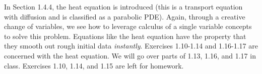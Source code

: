 \documentclass{amsart}
\theoremstyle{plain}
\theoremstyle{definition}
\theoremstyle{remark}
\theoremstyle{definition}
\numberwithin{equation}{section}
\numberwithin{equation}{section}
\begin{document}
In Section 1.4.4, the heat equation is introduced (this is a transport equation with diffusion and is classified as a parabolic PDE). 
Again, through a creative change of variables, we see how to leverage calculus of a single variable concepts to solve this problem. 
Equations like the heat equation have the property that they smooth out rough initial data {\em instantly}. 
Exercises 1.10-1.14 and 1.16-1.17 are concerned with the heat equation.
We will go over parts of 1.13, 1.16, and 1.17 in class. 
Exercises 1.10, 1.14, and 1.15 are left for homework.
\end{document}
